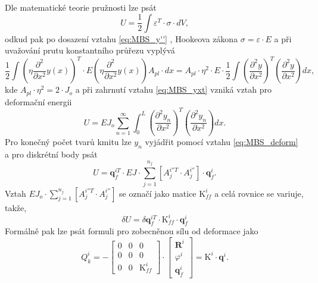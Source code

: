 Dle matematické teorie pružnosti \cite{cite:PPII} lze  psát
\begin{equation}\label{eq:MBS_Umat}
	U = \frac{1}{2} \int \varepsilon^T \cdot \sigma \cdot dV,
\end{equation}
odkud pak po dosazení vztahu \ref{eq:MBS_y''} , Hookeova zákona \cite{cite:PPI} $ \sigma = \varepsilon \cdot E $ a při uvažování prutu konstantního průřezu vyplývá
\begin{equation}\label{eq:MBS_U}
	\frac{1}{2} \int\left( \eta \frac{\partial^2 }{\partial x^2} y(x) \right)^T \cdot E \left( \eta \frac{\partial^2 }{\partial x^2} y(x) \right) A_{pl} \cdot dx = A_{pl} \cdot \eta^2 \cdot E \cdot \frac{1}{2} \int \left( \frac{\partial^2 y }{\partial x^2}\right) ^T \left( \frac{\partial^2 y }{\partial x^2}\right) dx,
\end{equation}
kde $ A_{pl} \cdot \eta^2 = 2\cdot J_{o} $ a při zahrnutí vztahu \ref{eq:MBS_yxt} vzniká vztah pro deformační energii
\begin{equation}\label{eq:MBS_Un}
	U = EJ_{o}\sum_{n=1}^{\infty} \int_{0}^{L} \left( \frac{\partial^2 y_n }{\partial x^2}\right) ^T \left( \frac{\partial^2 y_n }{\partial x^2}\right) dx.
\end{equation}
Pro konečný počet tvarů kmitu lze $ y_n $ vyjádřit pomocí vztahu \ref{eq:MBS_deform} a pro diskrétní body psát
\begin{equation}
	U =   \mathbf{q}_{f}^{iT} \cdot  EJ \cdot \sum_{j=1}^{n_j} \left[ A_j^{i''T} \cdot A_j^{i''} \right]  \cdot \mathbf{q}_{f}^{i}.
\end{equation}
Vztah $  EJ_{o} \cdot \sum_{j=1}^{n_j} \left[ A_j^{i''T} \cdot A_j^{i''} \right] $ se označí jako matice $ \mathrm{K}_{ff}^i $ a celá rovnice se variuje, takže,
\begin{equation}\label{eq:MBS_UKf}
	\delta U =   \delta\mathbf{q}_{f}^{iT} \cdot \mathrm{K}_{ff}^i \cdot \mathbf{q}_{f}^{i}
\end{equation}
Formálně pak lze psát formuli pro zobecněnou sílu od deformace jako
\begin{equation}\label{eq:MBS_zobec K}
	Q_k^i = - 
	\begin{bmatrix}
		0 & 0 & 0 \\ 
		0 & 0 & 0 \\ 
		0 & 0 & \mathrm{K}_{ff}^i
	\end{bmatrix} \cdot
	\begin{bmatrix}
		\mathbf{R}^i \\ 
		\varphi^i \\ 
		\mathbf{q}_{f}^{i}
	\end{bmatrix} = \mathrm{K}^i \cdot \mathbf{q}^i.
\end{equation}


